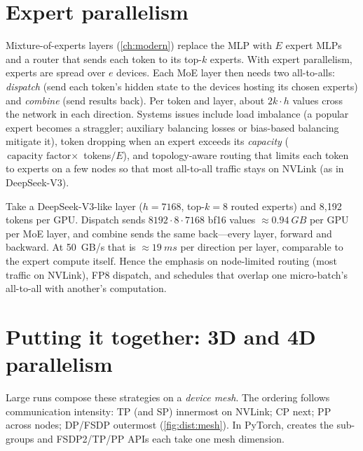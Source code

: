 \section{Expert parallelism}\label{sec:dist:ep}

Mixture-of-experts layers (\cref{ch:modern}) replace the MLP with $E$ expert MLPs and a router
that sends each token to its top-$k$ experts. With expert parallelism, experts are spread over
$e$ devices. Each MoE layer then needs two all-to-alls: \emph{dispatch} (send each token's hidden
state to the devices hosting its chosen experts) and \emph{combine} (send results back).
Per token and layer, about $2k\cdot h$ values cross the network in each direction. Systems
issues include load imbalance (a popular expert becomes a straggler; auxiliary balancing losses
or bias-based balancing mitigate it), token dropping when an expert exceeds its \emph{capacity}
($\text{capacity factor}\times$ tokens$/E$), and topology-aware routing that limits each token to
experts on a few nodes so that most all-to-all traffic stays on NVLink (as in DeepSeek-V3).

\begin{napkinmath}
Take a DeepSeek-V3-like layer ($h=7168$, top-$k=8$ routed experts) and 8{,}192 tokens per GPU.
Dispatch sends $8192\cdot8\cdot7168$ bf16 values $\approx\SI{0.94}{GB}$ per GPU per MoE layer, and
combine sends the same back---every layer, forward and backward. At \SI{50}{GB/s} that is
$\approx\SI{19}{ms}$ per direction per layer, comparable to the expert compute itself. Hence the
emphasis on node-limited routing (most traffic on NVLink), FP8 dispatch, and schedules that
overlap one micro-batch's all-to-all with another's computation.
\end{napkinmath}

\section{Putting it together: 3D and 4D parallelism}\label{sec:dist:3d}

Large runs compose these strategies on a \emph{device mesh}. The ordering follows
communication intensity: TP (and SP) innermost on NVLink; CP next; PP across nodes; DP/FSDP
outermost (\cref{fig:dist:mesh}). In PyTorch, 
creates the sub-groups and FSDP2/TP/PP APIs each take one mesh dimension.

